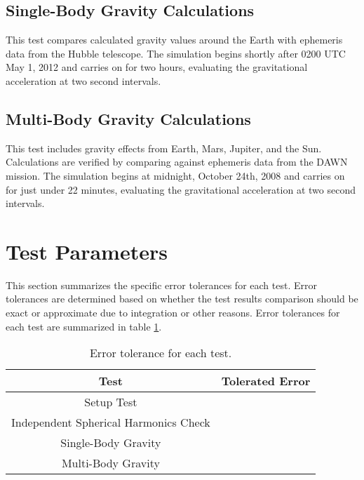 \subsection{Single-Body Gravity Calculations} This test compares calculated gravity values around the Earth with ephemeris data from the Hubble telescope. The simulation begins shortly after 0200 UTC May 1, 2012 and carries on for two hours, evaluating the gravitational acceleration at two  second intervals.
\subsection{Multi-Body Gravity Calculations} This test includes gravity effects from Earth, Mars, Jupiter, and the Sun. Calculations are verified by comparing against ephemeris data from the DAWN mission. The simulation begins at midnight, October 24th, 2008 and carries on for just under 22 minutes, evaluating the gravitational acceleration at two second intervals.

\section{Test Parameters}

This section summarizes the  specific error tolerances for each test. Error tolerances are determined based on whether the test results comparison should be exact or approximate due to integration or other reasons. Error tolerances for each test are summarized in table \ref{tab:errortol}. \\

\begin{table}[htbp]
	\caption{Error tolerance for each test.}
	\label{tab:errortol}
	\centering \fontsize{10}{10}\selectfont
	\begin{tabular}{ c | c } %
		\hline
		\textbf{Test}   							    & \textbf{Tolerated Error} 						  \\ \hline
		Setup Test                           			 & 		   \\ \hline
		Independent Spherical Harmonics Check  & 		   \\ \hline
		Single-Body Gravity						   & 														   \\ \hline
		Multi-Body Gravity 						   & 	 		       \\ \hline
	\end{tabular}
\end{table}

